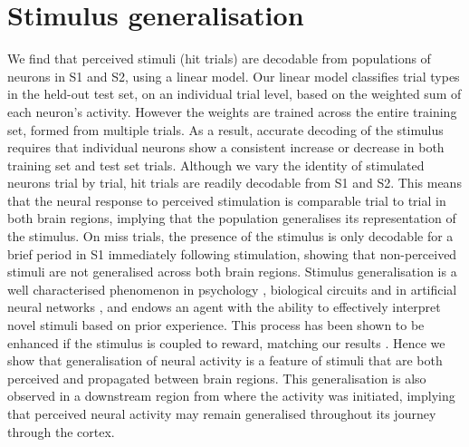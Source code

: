 \section{Stimulus generalisation}
We find that perceived stimuli (hit trials) are decodable from populations of neurons in S1 and S2, using a linear model. Our linear model classifies trial types in the held-out test set, on an individual trial level, based on the weighted sum of each neuron’s activity. However the weights are trained across the entire training set, formed from multiple trials. As a result, accurate decoding of the stimulus requires that individual neurons show a consistent increase or decrease in both training set and test set trials. Although we vary the identity of stimulated neurons trial by trial, hit trials are readily decodable from S1 and S2. This means that the neural response to perceived stimulation is comparable trial to trial in both brain regions, implying that the population generalises its representation of the stimulus. On miss trials, the presence of the stimulus is only decodable for a brief period in S1 immediately following stimulation, showing that non-perceived stimuli are not generalised across both brain regions. Stimulus generalisation is a well characterised phenomenon in psychology \cite{pavlov_conditioned_1927, pearce_model_1987}, biological circuits \cite{xu_neural_2013, henschke_reward_2020} and in artificial neural networks \cite{sietsma_creating_1991, jacot_neural_2018-1, summerfield_structure_2020}, and endows an agent with the ability to effectively interpret novel stimuli based on prior experience. This process has been shown to be enhanced if the stimulus is coupled to reward, matching our results \cite{henschke_reward_2020}. Hence we show that generalisation of neural activity is a feature of stimuli that are both perceived and propagated between brain regions. This generalisation is also observed in a downstream region from where the activity was initiated, implying that perceived neural activity may remain generalised throughout its journey through the cortex.

